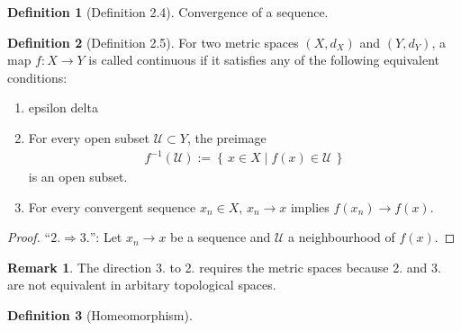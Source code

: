 \documentclass[a4paper]{book}
\theoremstyle{definition}
\newtheorem{definition}{Definition}[]
\newtheorem*{remark}{Remark}
\newcommand{\makeset}[2]{\left\{\, #1 \mid #2 \,\right\}}
\begin{document}
\begin{defbox}
    \begin{definition}[Definition 2.4]
        Convergence of a sequence.
    \end{definition}
\end{defbox}

\begin{defbox}
    \begin{definition}[Definition 2.5]
        For two metric spaces \((X, d_X)\) and \((Y, d_Y)\), a map \(f: X \longrightarrow Y\) is called continuous if it satisfies any of the following equivalent conditions:
        \begin{enumerate}
            \item epsilon delta
            \item For every open subset \(\mathcal{U} \subset Y\), the preimage
            \begin{align*}
                f^{-1}(\mathcal{U}) := \makeset{x \in X}{f(x) \in \mathcal{U}}
            \end{align*}
            is an open subset.
            \item For every convergent sequence \(x_n \in X\), \(x_n \rightarrow x\) implies \(f(x_n) \rightarrow f(x)\).
        \end{enumerate}
    \end{definition}
\end{defbox}
\begin{proof}
    ``\(2. \Rightarrow 3.\)'': Let \(x_n \rightarrow x\) be a sequence and \(\mathcal{U}\) a neighbourhood of \(f(x)\).
\end{proof}
\begin{rembox}
    \begin{remark}
        The direction 3. to 2. requires the metric spaces because 2. and 3. are not equivalent in arbitary topological spaces.
    \end{remark}
\end{rembox}

\begin{defbox}
    \begin{definition}[Homeomorphism]
        
    \end{definition}
\end{defbox}
\end{document}
